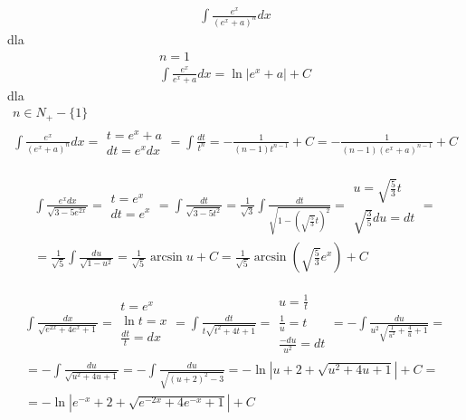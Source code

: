 
\begin{gather*}\int \frac{e^x}{(e^x+a)^n}dx\end{gather*}
dla \begin{gather*}\nonumber n=1 \\
\int \frac{e^x}{e^x+a}dx = \ln|e^x+a|+C\end{gather*}
dla \begin{gather*}\nonumber n \in N_+ -\{1\} \\
\int \frac{e^x}{(e^x+a)^n}dx = \begin{array}{|l|} t=e^x+a \\ dt=e^xdx \end{array} = \int \frac{dt}{t^n} = -\frac{1}{(n-1)t^{n-1}}+C = -\frac{1}{(n-1)(e^x+a)^{n-1}}+C \end{gather*}



\begin{gather*}\int \frac{e^xdx}{\sqrt{3-5e^{2x}}} = \begin{array}{|l|} t=e^x \\ dt=e^x \end{array} = \int \frac{dt}{\sqrt{3-5t^2}} = \frac{1}{\sqrt{3}}\int \frac{dt}{\sqrt{1-(\sqrt{\frac{5}{3}}t)^2}} = \begin{array}{|l|} u=\sqrt{\frac{5}{3}}t \\ \sqrt{\frac{3}{5}}du=dt \end{array} = \\ = \frac{1}{\sqrt{5}} \int \frac{du}{\sqrt{1-u^2}} = \frac{1}{\sqrt{5}} \arcsin u + C = \frac{1}{\sqrt{5}} \arcsin (\sqrt{\frac{5}{3}}e^x)+C\end{gather*}



\begin{gather*}\int \frac{dx}{\sqrt{e^{2x}+4e^x+1}} = \begin{array}{|l|} t=e^x \\ \ln t = x \\ \frac{dt}{t}=dx \end{array} = \int \frac{dt}{t\sqrt{t^2+4t+1}} = \begin{array}{|l|} u=\frac{1}{t} \\ \frac{1}{u}=t \\ \frac{-du}{u^2}=dt \end{array} = -\int \frac{du}{u^2\sqrt{\frac{1}{u^2}+\frac{4}{u}+1}} = \\ = -\int \frac{du}{\sqrt{u^2+4u+1}} = -\int \frac{du}{\sqrt{(u+2)^2-3}} = -\ln|u+2+\sqrt{u^2+4u+1}|+C = \\ = -\ln|e^{-x}+2+\sqrt{e^{-2x}+4e^{-x}+1}|+C\end{gather*}


